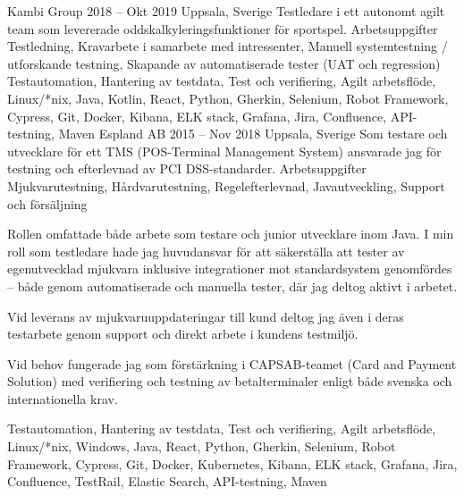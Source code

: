 \documentclass{sobCV}[2015/09/08]
\begin{document}
   {Kambi Group}
   {2018 -- Okt 2019}
   {Uppsala, Sverige}{
       Testledare i ett autonomt agilt team som levererade oddskalkyleringsfunktioner för sportspel.
   }
   {Arbetsuppgifter}{
       Testledning,
       Kravarbete i samarbete med intressenter,
       Manuell systemtestning / utforskande testning,
       Skapande av automatiserade tester (UAT och regression)
 }{
 }{
       Testautomation,
       Hantering av testdata,
       Test och verifiering,
       Agilt arbetsflöde, 
       Linux/*nix, 
       Java, 
       Kotlin, 
       React, 
       Python, 
       Gherkin, 
       Selenium, 
       Robot Framework,
       Cypress, 
       Git, 
       Docker, 
       Kibana, 
       ELK stack, 
       Grafana, 
       Jira, 
       Confluence, 
       API-testning, 
       Maven 
}
   {Espland AB}
   {2015 -- Nov 2018}
   {Uppsala, Sverige}{
       Som testare och utvecklare för ett TMS (POS-Terminal Management System) ansvarade jag för testning och efterlevnad av PCI DSS-standarder.
   }
   {Arbetsuppgifter}{
       Mjukvarutestning,
       Hårdvarutestning,
       Regelefterlevnad, 
       Javautveckling,
       Support och försäljning
 }{
      {
          Rollen omfattade både arbete som testare och junior utvecklare inom Java. I min roll som testledare hade jag huvudansvar för att säkerställa att tester av egenutvecklad mjukvara inklusive integrationer mot standardsystem genomfördes – både genom automatiserade och manuella tester, där jag deltog aktivt i arbetet.

          Vid leverans av mjukvaruuppdateringar till kund deltog jag även i deras testarbete genom support och direkt arbete i kundens testmiljö.

          Vid behov fungerade jag som förstärkning i CAPSAB-teamet (Card and Payment Solution) med verifiering och testning av betalterminaler enligt både svenska och internationella krav.
     }
 }{
       Testautomation,
       Hantering av testdata,
       Test och verifiering,
       Agilt arbetsflöde, 
       Linux/*nix, 
       Windows, 
       Java, 
       React, 
       Python, 
       Gherkin, 
       Selenium, 
       Robot Framework,
       Cypress, 
       Git, 
       Docker, 
       Kubernetes, 
       Kibana, 
       ELK stack, 
       Grafana, 
       Jira, 
       Confluence, 
       TestRail, 
       Elastic Search, 
       API-testning, 
       Maven 
}
\end{document}
